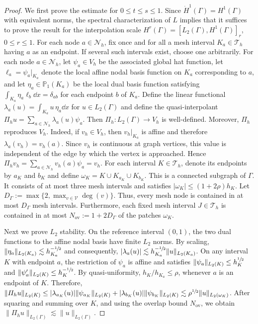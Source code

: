 \documentclass[numbers,webpdf]{ima-authoring-template}%
\theoremstyle{thmstyletwo}%
\numberwithin{equation}{section}
\begin{document}
\begin{proof}
    We first prove the estimate for $0\leq t\leq s\leq1$. Since $\dot H^1(\Gamma)=H^1(\Gamma)$ with equivalent norms, the spectral characterization of $L$ implies that it suffices to prove the result for the interpolation scale $H^r(\Gamma)=[L_2(\Gamma),H^1(\Gamma)]_r$, $0\le r\le1$. For each node $a\in\mathcal N_h$, fix once and for all a mesh interval $K_a\in\mathcal T_h$ having $a$ as an endpoint. If several such intervals exist, choose one arbitrarily. For each node $a\in\mathcal N_h$, let $\psi_a\in V_h$ be the associated global hat function, let $\ell_a = \psi_a|_{K_a}$ denote the local affine nodal basis function on $K_a$ corresponding to $a$, and let $\eta_a\in\mathbb P_1(K_a)$ be the local dual basis function satisfying $\int_{K_a}\eta_a\ell_b\dd x=\delta_{ab}$ for each endpoint $b$ of $K_a$. Define the linear functional $\lambda_a(u)=\int_{K_a}u\,\eta_a\dd x$ for $u\in L_2(\Gamma)$ and define the quasi-interpolant $\Pi_hu=\sum_{a\in\mathcal N_h}\lambda_a(u)\psi_a$. Then $\Pi_h:L_2(\Gamma)\to V_h$ is well-defined. Moreover, $\Pi_h$ reproduces $V_h$. Indeed, if $v_h\in V_h$, then $v_h|_{K_a}$ is affine and therefore $\lambda_a(v_h)=v_h(a)$. Since $v_h$ is continuous at graph vertices, this value is independent of the edge by which the vertex is approached. Hence $\Pi_hv_h=\sum_{a\in\mathcal N_h}v_h(a)\psi_a=v_h$. For each interval $K\in\mathcal T_h$, denote its endpoints by $a_K$ and $b_K$ and define $\omega_K=K\cup K_{a_K}\cup K_{b_K}$. This is a connected subgraph of $\Gamma$. It consists of at most three mesh intervals and satisfies $|\omega_K|\leq (1+2\rho)h_K$. Let $D_\Gamma:=\max\{2,\max_{v\in\mathcal V}\deg(v)\}$. Thus, every mesh node is contained in at most $D_\Gamma$ mesh intervals. Furthermore, each fixed mesh interval $J\in\mathcal T_h$ is contained in at most $N_{\mathrm{ov}}:=1+2D_\Gamma$ of the patches $\omega_K$.

    Next we prove $L_2$ stability. On the reference interval $(0,1)$, the two dual functions to the affine nodal basis have finite $L_2$ norms. By scaling, $\|\eta_a\|_{L_2(K_a)}\lesssim h_{K_a}^{-\sfrac{1}{2}}$ and consequently, $|\lambda_a(u)|\lesssim h_{K_a}^{-\sfrac{1}{2}}\|u\|_{L_2(K_a)}$. On any interval $K$ with endpoint $a$, the restriction of $\psi_a$ is affine and satisfies $\|\psi_a\|_{L_2(K)}\leq h_K^{\sfrac{1}{2}}$ and $\|\psi_a'\|_{L_2(K)}\leq h_K^{-\sfrac{1}{2}}$. By quasi-uniformity, $h_K/h_{K_a}\leq\rho$, whenever $a$ is an endpoint of $K$. Therefore, $\|{\mit\varPi}_hu\|_{L_2(K)} \leq |\lambda_{a_K}(u)|\|\psi_{a_K}\|_{L_2(K)} + |\lambda_{b_K}(u)|\|\psi_{b_K}\|_{L_2(K)} \lesssim \rho^{\sfrac{1}{2}}\|u\|_{L_2(\omega_K)}$. After squaring and summing over $K$, and using the overlap bound
    $N_{\mathrm{ov}}$, we obtain $\|\Pi_hu\|_{L_2(\Gamma)}\lesssim\|u\|_{L_2(\Gamma)}$.


\end{proof}
\end{document}
